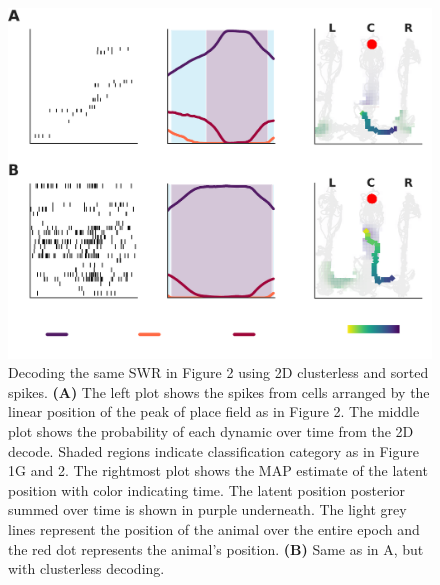 \documentclass[times, twoside]{zHenriquesLab-StyleBioRxiv}
\begin{document}
\begin{figure}%
\centering
\includegraphics[width=0.80\linewidth]{figures/Figure2-supplemental1/Figure2_v2-supplemental1}
\caption{Decoding the same SWR in Figure 2 using 2D clusterless and sorted spikes. \textbf{(A)} The left plot shows the spikes from cells arranged by the linear position of the peak of place field as in Figure 2. The middle plot shows the probability of each dynamic over time from the 2D decode. Shaded regions indicate classification category as in Figure 1G and 2. The rightmost plot shows the MAP estimate of the latent position with color indicating time. The latent position posterior summed over time is shown in purple underneath. The light grey lines represent the position of the animal over the entire epoch and the red dot represents the animal's position. \textbf{(B)} Same as in A, but with clusterless decoding.}
\label{fig:Figure2-Figure supplement 1}
\end{figure}
\end{document}
